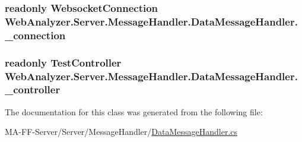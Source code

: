 \subsubsection[{\+\_\+connection}]{\setlength{\rightskip}{0pt plus 5cm}readonly {\bf Websocket\+Connection} Web\+Analyzer.\+Server.\+Message\+Handler.\+Data\+Message\+Handler.\+\_\+connection\hspace{0.3cm}{\ttfamily [private]}}\label{class_web_analyzer_1_1_server_1_1_message_handler_1_1_data_message_handler_a7699c0f75aee40ba03a6be8ea3592df8}
\hypertarget{class_web_analyzer_1_1_server_1_1_message_handler_1_1_data_message_handler_ae67a8ffd73f0ae8ff422db335a7e7924}{}
\subsubsection[{\+\_\+controller}]{\setlength{\rightskip}{0pt plus 5cm}readonly {\bf Test\+Controller} Web\+Analyzer.\+Server.\+Message\+Handler.\+Data\+Message\+Handler.\+\_\+controller\hspace{0.3cm}{\ttfamily [private]}}\label{class_web_analyzer_1_1_server_1_1_message_handler_1_1_data_message_handler_ae67a8ffd73f0ae8ff422db335a7e7924}


The documentation for this class was generated from the following file\+:\begin{DoxyCompactItemize}
\item 
M\+A-\/\+F\+F-\/\+Server/\+Server/\+Message\+Handler/\hyperlink{_data_message_handler_8cs}{Data\+Message\+Handler.\+cs}\end{DoxyCompactItemize}
